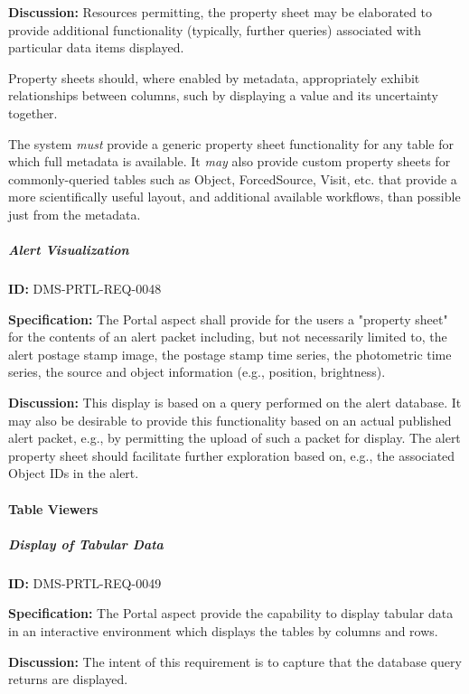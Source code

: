 \documentclass[SE,toc]{lsstdoc}
\begin{document}
\textbf{Discussion:}
Resources permitting, the property sheet may be elaborated to provide additional functionality (typically, further queries) associated with particular data items displayed.

Property sheets should, where enabled by metadata, appropriately exhibit relationships between columns, such by displaying a value and its uncertainty together.

The system \textit{must} provide a generic property sheet functionality for any table for which full metadata is available. It \textit{may} also provide custom property sheets for commonly-queried tables such as Object, ForcedSource, Visit, etc. that provide a more scientifically useful layout, and additional available workflows, than possible just from the metadata.

\subparagraph{Alert Visualization}\hfill  %

\label{DMS-PRTL-REQ-0048}
\textbf{ID:} DMS-PRTL-REQ-0048

\textbf{Specification:}
The Portal aspect shall provide for the users a "property sheet" for the contents of an alert packet including, but not necessarily limited to, the alert postage stamp image, the postage stamp time series, the photometric time series, the source and object information (e.g., position, brightness).

\textbf{Discussion:}
This display is based on a query performed on the alert database.  It may also be desirable to provide this functionality based on an actual published alert packet, e.g., by permitting the upload of such a packet for display.
The alert property sheet should facilitate further exploration based on, e.g., the associated Object IDs in the alert.

\paragraph{Table Viewers}\hfill  %

\subparagraph{Display of Tabular Data}\hfill  %

\label{DMS-PRTL-REQ-0049}
\textbf{ID:} DMS-PRTL-REQ-0049

\textbf{Specification:}
The Portal aspect provide the capability to display tabular data in an interactive environment which displays the tables by columns and rows.

\textbf{Discussion:}
The intent of this requirement is to capture that the database query returns are displayed.
\end{document}
